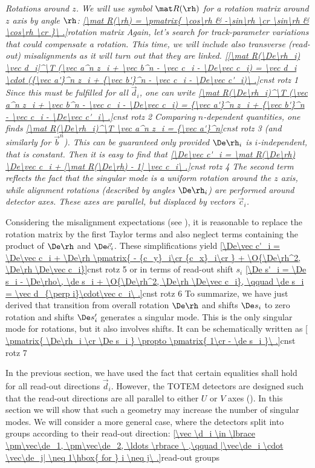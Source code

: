 \em{Rotations around $z$}. We will use symbol $\mat R(\rh)$ for a rotation matrix around $z$ axis by angle $\rh$:
\eqref{\mat R(\rh) = \pmatrix{
\cos\rh & -\sin\rh \cr
\sin\rh & \cos\rh \cr
}\ .}{rotation matrix}
Again, let's search for track-parameter variations that could compensate a rotation. This time, we will include also transverse (read-out) misalignments as it will turn out that they are linked.
\eqref{[\mat R(\De\rh_i) \vec d_i]^\T (\vec a^n z_i + \vec b^n - \vec c_i - \De\vec c_i) = \vec d_i \cdot ({\vec a'}^n z_i + {\vec b'}^n - \vec c_i - \De\vec c'_i)\ .}{cnst rotz 1}
Since this must be fulfilled for all $\vec d_i$, one can write
\eqref{\mat R(\De\rh_i)^\T (\vec a^n z_i + \vec b^n - \vec c_i - \De\vec c_i) = {\vec a'}^n z_i + {\vec b'}^n - \vec c_i - \De\vec c'_i\ .}{cnst rotz 2}
Comparing $n$-dependent quantities, one finds
\eqref{\mat R(\De\rh_i)^\T \vec a^n z_i = {\vec a'}^n}{cnst rotz 3}
(and similarly for $\vec b^n$). This can be guaranteed only provided $\De\rh_i$ is $i$-independent, that is constant. Then it is easy to find that
\eqref{\De\vec c'_i = \mat R(\De\rh) \De\vec c_i + [\mat R(\De\rh) - 1] \vec c_i\ .}{cnst rotz 4}
The second term reflects the fact that the singular mode is a uniform rotation around the $z$ axis, while alignment rotations (described by angles $\De\rh_i$) are performed around detector axes. These axes are parallel, but displaced by vectors $\vec c_i$.

Considering the misalignment expectations (see ), it is reasonable to replace the rotation matrix by the first Taylor terms and also neglect terms containing the product of $\De\rh$ and $\De\vec c_i$. These simplifications yield
\eqref{\De\vec c'_i = \De\vec c_i + \De\rh \pmatrix{
- {c_y}_i\cr
{c_x}_i\cr
} + \O{\De\rh^2, \De\rh \De\vec c_i}}{cnst rotz 5}
or in terms of read-out shift $s_i$
\eqref{\De s'_i = \De s_i - \De\rho\, \de s_i + \O{\De\rh^2, \De\rh \De\vec c_i}, \qquad \de s_i = \vec d_{\perp i}\cdot\vec c_i\ .}{cnst rotz 6}
To summarize, we have just derived that transition from overall rotation $\De\rh$ and shifts $\De s_i$ to zero rotation and shifts $\De s_i'$ generates a singular mode. This is the only singular mode for rotations, but it also involves shifts. It can be schematically written as
\eqref{
\pmatrix{
\De\rh_i \cr
\De s_i
} \propto \pmatrix{
1\cr
- \de s_i
}\ .}{cnst rotz 7}



In the previous section, we have used the fact that certain equalities shall hold for all read-out directions $\vec d_i$. However, the TOTEM detectors are designed such that the read-out directions are all parallel to either $U$ or $V$ axes (). In this section we will show that such a geometry may increase the number of singular modes. We will consider a more general case, where the detectors split into groups according to their read-out direction:
\eqref{\vec \d_i \in \lbrace \pm\vec\de_1, \pm\vec\de_2, \ldots \rbrace \ ,\qquad |\vec\de_i \cdot \vec\de_j| \neq 1\hbox{ for } i \neq j\ .}{read-out groups}

